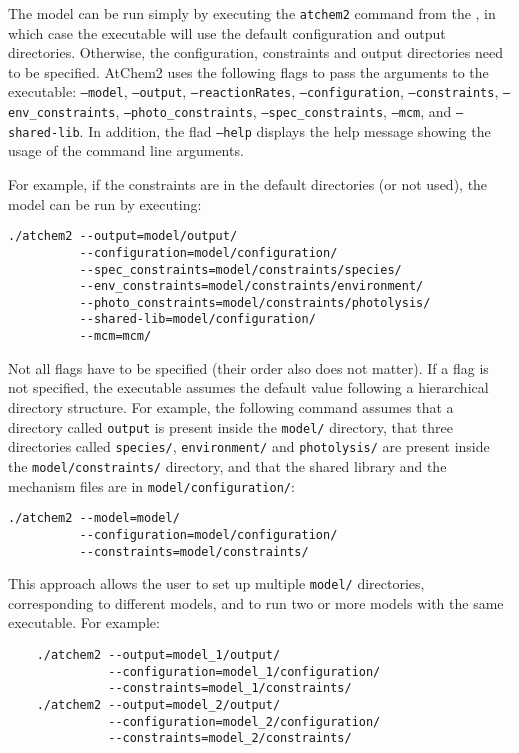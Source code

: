 The model can be run simply by executing the \texttt{atchem2} command
from the \maindir, in which case the executable will use the default
configuration and output directories. Otherwise, the configuration,
constraints and output directories need to be specified. AtChem2 uses
the following flags to pass the arguments to the executable:
\texttt{--model}, \texttt{--output}, \texttt{--reactionRates},
\texttt{--configuration}, \texttt{--constraints},
\texttt{--env\_constraints}, \texttt{--photo\_constraints},
\texttt{--spec\_constraints}, \texttt{--mcm}, and
\texttt{--shared-lib}. In addition, the flad \texttt{--help} displays
the help message showing the usage of the command line arguments.

For example, if the constraints are in the default directories (or not
used), the model can be run by executing:

\begin{verbatim}
./atchem2 --output=model/output/
          --configuration=model/configuration/
          --spec_constraints=model/constraints/species/
          --env_constraints=model/constraints/environment/
          --photo_constraints=model/constraints/photolysis/
          --shared-lib=model/configuration/
          --mcm=mcm/
\end{verbatim}

Not all flags have to be specified (their order also does not
matter). If a flag is not specified, the executable assumes the
default value following a hierarchical directory structure. For
example, the following command assumes that a directory called
\texttt{output} is present inside the \texttt{model/} directory, that
three directories called \texttt{species/}, \texttt{environment/} and
\texttt{photolysis/} are present inside the
\texttt{model/constraints/} directory, and that the shared library and
the mechanism files are in \texttt{model/configuration/}:

\begin{verbatim}
./atchem2 --model=model/
          --configuration=model/configuration/
          --constraints=model/constraints/
\end{verbatim}

This approach allows the user to set up multiple \texttt{model/}
directories, corresponding to different models, and to run two or
more models with the same executable. For example:

\begin{verbatim}
    ./atchem2 --output=model_1/output/
              --configuration=model_1/configuration/
              --constraints=model_1/constraints/
    ./atchem2 --output=model_2/output/
              --configuration=model_2/configuration/
              --constraints=model_2/constraints/
\end{verbatim}

